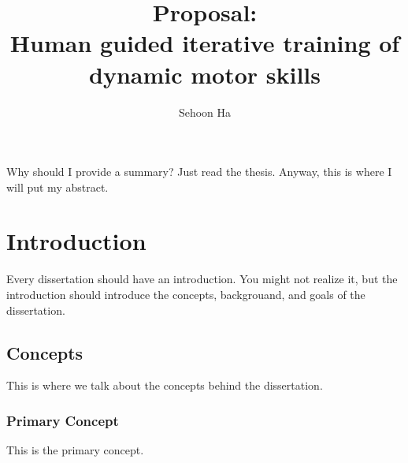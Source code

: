 \documentclass[12pt]{gatech-thesis}
\title{Proposal: \protect\\ Human guided iterative training of dynamic motor skills} %
\author{Sehoon Ha}
\begin{document}


\begin{preliminary}
\contents
\begin{summary}
  Why should I provide a summary?  Just read the thesis.
  Anyway, this is where I will put my abstract.
\end{summary}
\end{preliminary}


\chapter{Introduction}

Every dissertation should have an introduction.  You might not realize
it, but the introduction should introduce the concepts, backgrouand,
and goals of the dissertation.

\section{Concepts}

This is where we talk about the concepts behind the dissertation.

\subsection{Primary Concept}

This is the primary concept.
\end{document}
